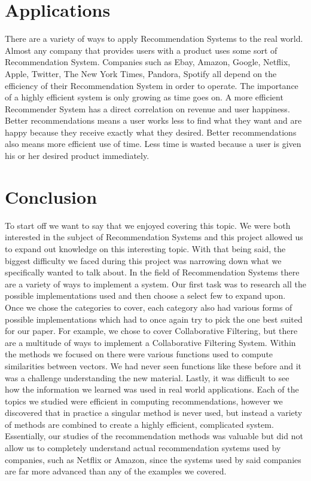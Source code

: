 \documentclass[11pt,reqno]{amsart}
\theoremstyle{definition}
\numberwithin{equation}{subsection}
\begin{document}
\section{Applications}

There are a variety of ways to apply Recommendation Systems to the real world.  Almost any company that provides users with a product uses some sort of Recommendation System. Companies such as Ebay, Amazon, Google, Netflix, Apple, Twitter, The New York Times, Pandora, Spotify all depend on the efficiency of their Recommendation System in order to operate.  The importance of a highly efficient system is only growing as time goes on.  A more efficient Recommender System has a direct correlation on revenue and user happiness. Better recommendations means a user works less to find what they want and are happy because they receive exactly what they desired. Better recommendations also means more efficient use of time. Less time is wasted because a user is given his or her desired product immediately.

\section{Conclusion}

To start off we want to say that we enjoyed covering this topic. We were both interested in the subject of Recommendation Systems and this project allowed us to expand out knowledge on this interesting topic. With that being said, the biggest difficulty we faced during this project was narrowing down what we specifically wanted to talk about. In the field of Recommendation Systems there are a variety of ways to implement a system. Our first task was to research all the possible implementations used and then choose a select few to expand upon.  Once we chose the categories to cover, each category also had various forms of possible implementations which had to once again try to pick the one best suited for our paper.  For example, we chose to cover Collaborative Filtering, but there are a multitude of ways to implement a Collaborative Filtering System. Within the methods we focused on there were various functions used to compute similarities between vectors. We had never seen functions like these before and it was a challenge understanding the new material. Lastly, it was difficult to see how the information we learned was used in real world applications.  Each of the topics we studied were efficient in computing recommendations, however we discovered that in practice a singular method is never used, but instead a variety of methods are combined to create a highly efficient, complicated system. Essentially, our studies of the recommendation methods was valuable but did not allow us to completely understand actual recommendation systems used by companies, such as Netflix or Amazon, since the systems used by said companies are far more advanced than any of the examples we covered.
\end{document}
